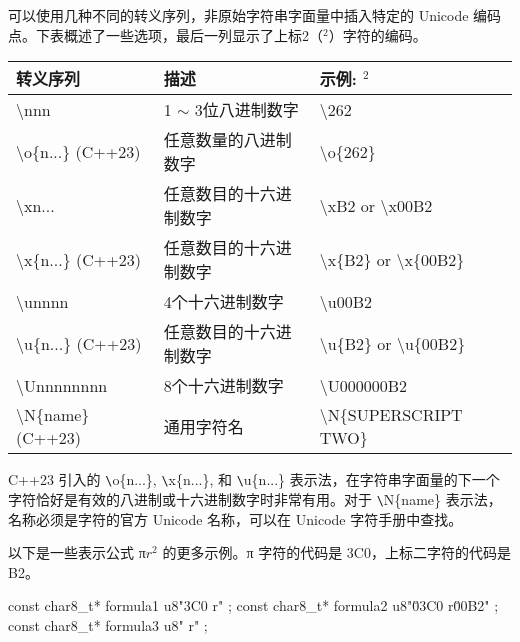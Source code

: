 可以使用几种不同的转义序列，非原始字符串字面量中插入特定的 Unicode 编码点。下表概述了一些选项，最后一列显示了上标2（$^2$）字符的编码。

\begin{longtable}{|l|l|l|}
\hline
\textbf{转义序列}          & \textbf{描述}                   & \textbf{示例:  $^2$}                                  \\ \hline
\endfirsthead
%
\endhead
%
\textbackslash{}nnn               & 1 $\sim$ 3位八进制数字                    & \textbackslash{}262                                  \\ \hline
\textbackslash{}o\{n...\} (C++23) & 任意数量的八进制数字       & \textbackslash{}o\{262\}                             \\ \hline
\textbackslash{}xn...             & 任意数目的十六进制数字 & \textbackslash{}xB2 or \textbackslash{}x00B2         \\ \hline
\textbackslash{}x\{n...\} (C++23) & 任意数目的十六进制数字 & \textbackslash{}x\{B2\} or \textbackslash{}x\{00B2\} \\ \hline
\textbackslash{}unnnn             & 4个十六进制数字                   & \textbackslash{}u00B2                                \\ \hline
\textbackslash{}u\{n...\} (C++23) & 任意数目的十六进制数字 & \textbackslash{}u\{B2\} or \textbackslash{}u\{00B2\} \\ \hline
\textbackslash{}Unnnnnnnn         & 8个十六进制数字                   & \textbackslash{}U000000B2                            \\ \hline
\textbackslash{}N\{name\} (C++23) & 通用字符名               & \textbackslash{}N\{SUPERSCRIPT TWO\}                 \\ \hline
\end{longtable}

C++23 引入的 \verb|\|o\{n...\}, \verb|\|x\{n...\}, 和 \verb|\|u\{n...\} 表示法，在字符串字面量的下一个字符恰好是有效的八进制或十六进制数字时非常有用。对于 \verb|\|N\{name\} 表示法，名称必须是字符的官方 Unicode 名称，可以在 Unicode 字符手册中查找。

以下是一些表示公式 π$r^2$ 的更多示例。π 字符的代码是 3C0，上标二字符的代码是 B2。

\begin{cpp}
const char8_t* formula1 { u8"\x3C0 r" };
const char8_t* formula2 { u8"\u03C0 r\u00B2" };
const char8_t* formula3 { u8" r" };
\end{cpp}

